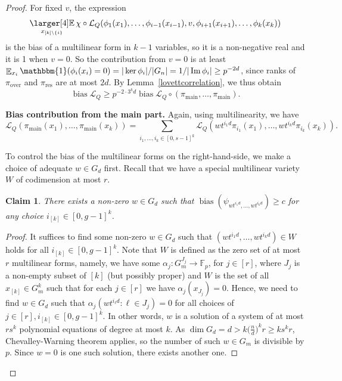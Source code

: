 \documentclass[a4paper,11pt]{article}
\newtheorem{claim}[theorem]{Claim}
\theoremstyle{definition}
\newcommand\id{\mathbbm{1}}
\newcommand{\on}[1]{
	\operatorname{#1}
}
\newcommand\ex{\mathop{\mathbb{E}}}
\newcommand{\exx}{
  \mathop{
    \mathchoice{\vcenter{\hbox{\larger[4]$\mathbb{E}$}}}
               {\kern0pt\mathbb{E}}
               {\kern0pt\mathbb{E}}
               {\kern0pt\mathbb{E}}
  }\displaylimits
}
\begin{document}
\begin{proof}
    For fixed $v$, the expression
    \[\exx_{x_{[k] \setminus \{i\}}} \chi \circ \mathcal{L}_Q(\phi_1(x_1), \dots, \phi_{i-1}(x_{i-1}), v, \phi_{i+1}(x_{i+1}), \dots, \phi_{k}(x_{k}))\]
    is the bias of a multilinear form in $k-1$ variables, so it is a non-negative real and it is 1 when $v = 0$. So the contribution from $v= 0$ is at least $\ex_{x_i} \id(\phi_i(x_i) = 0) = |\on{ker}\phi_i|/|G_n| = 1/|\on{Im} \phi_i| \geq p^{-2d}$, since ranks of $\pi_{\on{over}}$ and $\pi_{\on{res}}$ are at most $2d$. By Lemma~\ref{lovettcorrelation}, we thus obtain
    \begin{equation}\label{smallpartsremovallqbias}\on{bias} \mathcal{L}_Q \geq p^{-2\cdot3^k d} \on{bias}\mathcal{L}_Q \circ (\pi_{\on{main}}, \dots, \pi_{\on{main}}).\end{equation}

    \textbf{Bias contribution from the main part.} Again, using multilinearity, we have
    \begin{equation}\mathcal{L}_Q(\pi_{\on{main}}(x_1), \dots, \pi_{\on{main}}(x_k)) = \sum_{i_1, \dots, i_k \in [0, s-1]^k} \mathcal{L}_Q(wt^{i_1d} \pi_{i_1}(x_1), \dots, wt^{i_kd} \pi_{i_k}(x_k)).\label{lqmaindecomposition}\end{equation}

    To control the bias of the multilinear forms on the right-hand-side, we make a choice of adequate $w \in G_d$ first. Recall that we have a special multilinear variety $W$ of codimension at most $r$.

    \begin{claim}
        There exists a non-zero $w\in G_{d}$ such that $\on{bias} (\psi_{wt^{i_1d}, \ldots, wt^{i_kd}}) \geq c$ for any choice $i_{[k]} \in [0, g-1]^k$.     
    \end{claim}

    \begin{proof}
        It suffices to find some non-zero $w \in G_d$ such that $(wt^{i_1d}, \ldots, wt^{i_kd}) \in W$ holds for all $i_{[k]}\in [0, g-1]^k$. Note that $W$ is defined as the zero set of at most $r$ multilinear forms, namely, we have some $\alpha_j: G_m^{J_j} \to \mathbb{F}_p$, for $j \in [r]$, where $J_j$ is a non-empty subset of $[k]$ (but possibly proper) and $W$ is the set of all $x_{[k]} \in G_m^k$ such that for each $j\in [r]$ we have $\alpha_j(x_{J_j}) = 0$. Hence, we need to find $w \in G_{d}$ such that $\alpha_j(wt^{i_
        \ell d}: \ell \in J_j) = 0$ for all choices of $j \in [r], i_{[k]}\in [0,g-1]^k$. In other words, $w$ is a solution of a system of at most $r s^k$ polynomial equations of degree at most $k$. As $\dim G_{d} = d > k \Big(\frac{n}{d}\Big)^k r \geq k s^k r$, Chevalley-Warning theorem applies, so the number of such $w \in G_{m}$ is divisible by $p$. Since $w = 0$ is one such solution, there exists another one.
    \end{proof}



\end{proof}
\end{document}
